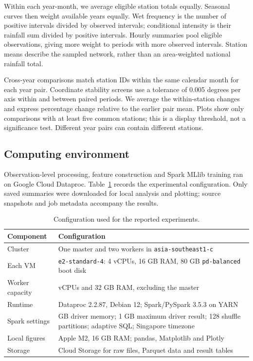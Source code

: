 Within each year-month, we average eligible station totals equally. Seasonal curves then weight available years equally. Wet frequency is the number of positive intervals divided by observed intervals; conditional intensity is their rainfall sum divided by positive intervals. Hourly summaries pool eligible observations, giving more weight to periods with more observed intervals. Station means describe the sampled network, rather than an area-weighted national rainfall total.

Cross-year comparisons match station IDs within the same calendar month for each year pair. Coordinate stability screens use a tolerance of 0.005 degrees per axis within and between paired periods. We average the within-station changes and express percentage change relative to the earlier pair mean. Plots show only comparisons with at least five common stations; this is a display threshold, not a significance test. Different year pairs can contain different stations.

\subsection{Computing environment}
Observation-level processing, feature construction and Spark MLlib training ran on Google Cloud Dataproc. Table~\ref{tab:environment} records the experimental configuration. Only saved summaries were downloaded for local analysis and plotting; source snapshots and job metadata accompany the results.

\begin{table}[htbp]\small\centering
\begin{tabularx}{\linewidth}{>{\raggedright\arraybackslash}p{.22\linewidth}>{\raggedright\arraybackslash}X}
\toprule Component & Configuration\\\midrule
Cluster & One master and two workers in \texttt{asia-southeast1-c}\\
Each VM & \texttt{e2-standard-4}: 4 vCPUs, 16 GB RAM, 80 GB \texttt{pd-balanced} boot disk\\
Worker capacity & 8 vCPUs and 32 GB RAM, excluding the master\\
Runtime & Dataproc 2.2.87, Debian 12; Spark/PySpark 3.5.3 on YARN\\
Spark settings & 6 GB driver memory; 1 GB maximum driver result; 128 shuffle partitions; adaptive SQL; Singapore timezone\\
Local figures & Apple M2, 16 GB RAM; pandas, Matplotlib and Plotly\\
Storage & Cloud Storage for raw files, Parquet data and result tables\\
\bottomrule
\end{tabularx}
\caption{Configuration used for the reported experiments.}
\label{tab:environment}
\end{table}
